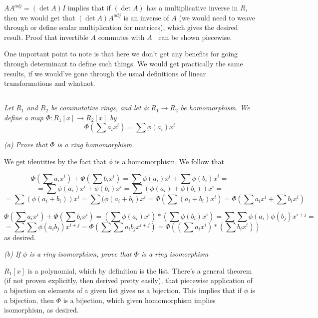 \documentclass[11pt,oneside,titlepage]{book}
\DeclareMathOperator \inv {^{-1}}
\begin{document}
$A A^{adj} = (\det A) I$ implies that if $(\det A)$ has a
multiplicative inverse in $R$, then we would get that $(\det
A)A^{adj}$ is an inverse of $A$ (we would need to weave through or
define scalar multiplication for matrices), which gives the desired
result. Proof that invertible $A$ commutes with $A\inv$ can be shown
piecewise.

One important point to note is that here we don't get any benefits for
going through determinant to define such things. We would get
practically the same results, if we would've gone through the usual
definitions of linear transformations and whatnot.

\subsection{}

\textit{Let $R_1$ and $R_2$ be commutative rings, and let $\phi: R_1
\to R_2$ be homomorphism. We define a map $\Phi: R_1[x] \to R_2[x]$ by
  $$\Phi(\sum{a_i x^i}) = \sum {\phi(a_i) x^i}$$
}

\textit{(a) Prove that $\Phi$ is a ring homomorphism.}

We get identities by the fact that $\phi$ is a homomorphism. We follow
that

$$\Phi(\sum{a_i x^i}) + \Phi(\sum{b_i x^i}) = \sum{\phi(a_i) x^i} + \sum{\phi(b_i) x^i} = $$
$$ =  \sum{\phi(a_i) x^i + \phi(b_i) x^i}= \sum{(\phi(a_i) + \phi(b_i)) x^i} = $$
$$ =  \sum{(\phi(a_i + b_i)) x^i}= \sum{(\phi(a_i + b_i) x^i}= \Phi(\sum{(a_i + b_i) x^i}) =
\Phi(\sum{a_i x^i} + \sum{b_i x^i} )$$

$$ \Phi(\sum{a_i x^i}) + \Phi(\sum{b_i x^i}) =
(\sum{\phi(a_i) x^i}) * ( \sum{\phi(b_i) x^i}) = \sum{\sum{\phi(a_i)
\phi(b_j) x^{i + j}}} = $$
$$ = \sum{\sum{\phi(a_i b_j) x^{i + j}}} = \Phi(\sum{\sum{a_i b_j x^{i + j}}}) =
\Phi((\sum{a_i x^i}) * (\sum{b_i x^i}))$$ as desired.

\textit{(b) If $\phi$ is a ring isomorphism, prove that $\Phi$ is a
ring isomorphism}

$R_1[x]$ is a polynomial, which by definition is the list. There's a
general theorem (if not proven explicitly, then derived pretty
easily), that piecewise application of a bijection on elements of a
given list gives us a bijection. This implies that if $\phi$ is a
bijection, then $\Phi$ is a bijection, which given homomorphism
implies isomorphism, as desired.

\subsection{}
\end{document}

